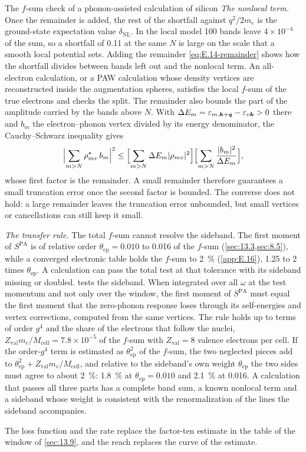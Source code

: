 \begin{workedexample}{The $f$-sum check of a phonon-assisted calculation of silicon}
\emph{The nonlocal term.} Once the remainder is added, the rest of the shortfall against $q^2/2m_e$ is the ground-state expectation value $\delta_{\mathrm{NL}}$. In the local model 100 bands leave $4\times10^{-4}$ of the sum, so a shortfall of 0.11 at the same $N$ is large on the scale that a smooth local potential sets. Adding the remainder \cref{eq:E.14-remainder} shows how the shortfall divides between bands left out and the nonlocal term. An all-electron calculation, or a PAW calculation whose density vertices are reconstructed inside the augmentation spheres, satisfies the local $f$-sum of the true electrons and checks the split. The remainder also bounds the part of the amplitude carried by the bands above $N$. With $\Delta E_m = \varepsilon_{m,\bm{k}+\bm{q}} - \varepsilon_{v\bm{k}} > 0$ there and $b_m$ the electron--phonon vertex divided by its energy denominator, the Cauchy--Schwarz inequality gives
\begin{equation*}
  \Bigl|\sum_{m>N}\rho_{mv}^*\,b_m\Bigr|^2 \le \Bigl[\sum_{m>N}\Delta E_m|\rho_{mv}|^2\Bigr]\Bigl[\sum_{m>N}\frac{|b_m|^2}{\Delta E_m}\Bigr] ,
\end{equation*}
whose first factor is the remainder. A small remainder therefore guarantees a small truncation error once the second factor is bounded. The converse does not hold: a large remainder leaves the truncation error unbounded, but small vertices or cancellations can still keep it small.

\emph{The transfer rule.} The total $f$-sum cannot resolve the sideband. The first moment of $S^{\mathrm{PA}}$ is of relative order $\theta_{\mathrm{ep}} = 0.010$ to 0.016 of the $f$-sum (\cref{sec:13.3,sec:8.5}), while a converged electronic table holds the $f$-sum to \SI{2}{\percent} (\cref{app:E.16}), 1.25 to 2 times $\theta_{\mathrm{ep}}$. A calculation can pass the total test at that tolerance with its sideband missing or doubled.  tests the sideband. When integrated over all $\omega$ at the test momentum and not only over the window, the first moment of $S^{\mathrm{PA}}$ must equal the first moment that the zero-phonon response loses through its self-energies and vertex corrections, computed from the same vertices. The rule holds up to terms of order $g^4$ and the share of the electrons that follow the nuclei, $Z_{\mathrm{val}}m_e/M_{\mathrm{cell}} = 7.8\times10^{-5}$ of the $f$-sum with $Z_{\mathrm{val}} = 8$ valence electrons per cell. If the order-$g^4$ term is estimated as $\theta_{\mathrm{ep}}^2$ of the $f$-sum, the two neglected pieces add to $\theta_{\mathrm{ep}}^2 + Z_{\mathrm{val}}m_e/M_{\mathrm{cell}}$, and relative to the sideband's own weight $\theta_{\mathrm{ep}}$ the two sides must agree to about \SI{2}{\percent}: \SI{1.8}{\percent} at $\theta_{\mathrm{ep}} = 0.010$ and \SI{2.1}{\percent} at 0.016. A calculation that passes all three parts has a complete band sum, a known nonlocal term and a sideband whose weight is consistent with the renormalization of the lines the sideband accompanies.
\end{workedexample}

The loss function and the rate replace the factor-ten estimate in the table of the window of \cref{sec:13.9}, and the reach replaces the curve of the estimate.
